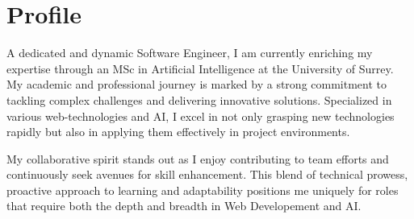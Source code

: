 \makecvtitle

\section{Profile}


A dedicated and dynamic Software Engineer, I am currently enriching my expertise through an MSc in Artificial Intelligence
at the University of Surrey. My academic and professional journey is marked by a strong commitment to tackling complex
challenges and delivering innovative solutions. Specialized in various web-technologies and AI, I excel in not only
grasping new technologies rapidly but also in applying them effectively in project environments.

My collaborative spirit stands out as I enjoy contributing to team efforts and continuously seek avenues for skill
enhancement. This blend of technical prowess, proactive approach to learning and adaptability positions me
uniquely for roles that require both the depth and breadth in Web Developement and AI.

